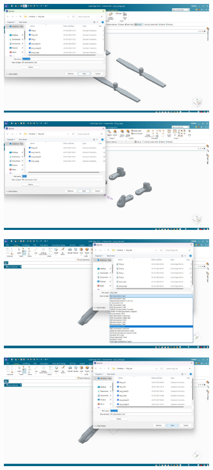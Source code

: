 \documentclass{article}
\begin{document}
\begin{figure}[H]
\centering
\includegraphics[scale = 0.3 ]{./figs/4.jpeg}
\end{figure}
\begin{figure}[H]
\centering
\includegraphics[scale = 0.3 ]{./figs/5.jpeg}
\end{figure}
\begin{figure}[H]
\centering
\includegraphics[scale = 0.3 ]{./figs/6.jpeg}
\end{figure}
\begin{figure}[H]
\centering
\includegraphics[scale = 0.3 ]{./figs/7.jpeg}
\end{figure}
\end{document}
